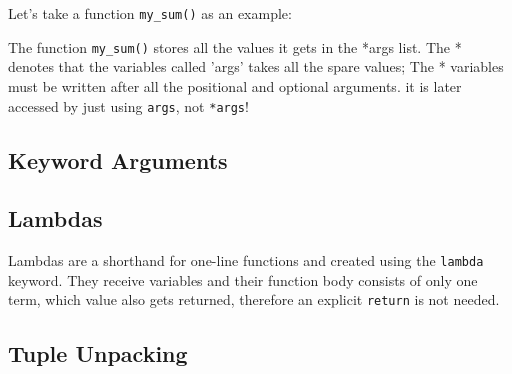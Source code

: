     Let's take a function \texttt{my_sum()} as an example:


    The function \texttt{my_sum()} stores all the values it gets in the *args list.
    The * denotes that the variables called 'args' takes all the spare values; The * variables must
    be written after all the positional and optional arguments.
    it is later accessed by just using \texttt{args}, not \texttt{*args}!
  
  \subsection{Keyword Arguments}

  \subsection{Lambdas}
    Lambdas are a shorthand for one-line functions and created using the
    \texttt{lambda} keyword. They receive variables and their function body consists
    of only one term, which value also gets returned, therefore an explicit
    \texttt{return} is not needed.


  \subsection{Tuple Unpacking}